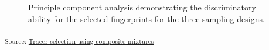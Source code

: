 \documentclass[
  number]{elsarticle}
\begin{document}
\begin{figure}[H]


\caption{\label{fig-pcaplot}Principle component analysis demonstrating
the discriminatory ability for the selected fingerprints for the three
sampling designs.}

\end{figure}%

\textsubscript{Source:
\href{https://alex-koiter.github.io/sampling-design-manuscript/notebooks/Tracer_selection-preview.html\#cell-fig-pcaplot}{Tracer
selection using composite mixtures}}
\end{document}
